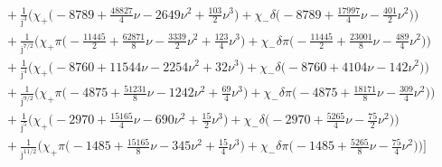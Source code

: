\documentclass[prd,superscriptaddress,preprintnumbers,tightenlines,nofootinbib, eqsecnum]{revtex4-2}
\newcommand{\nn}{\nonumber}
\begin{document}
\begin{align}
&\qquad\quad + \frac{1}{\bar{\jmath}^{3}}\Bigg(\chi_{+}\bigg(-8789 + \frac{48827}{4}\nu - 2649 \nu^{2} + \frac{103}{2}\nu^{3}\bigg) + \chi_{-}\delta\bigg(-8789 + \frac{17997}{4}\nu - \frac{401}{2}\nu^{2}\bigg)\Bigg) \nn \\
&\qquad\quad + \frac{1}{\bar{\jmath}^{7/2}}\Bigg(\chi_{+}\pi\bigg(-\frac{11445}{2} + \frac{62871}{8}\nu - \frac{3339}{2}\nu^{2} + \frac{123}{4}\nu^{3}\bigg) + \chi_{-}\delta\pi\bigg(-\frac{11445}{2} + \frac{23001}{8}\nu - \frac{489}{4}\nu^{2}\bigg)\Bigg) \nn \\
&\qquad\quad + \frac{1}{\bar{\jmath}^{4}}\Bigg(\chi_{+}\bigg(-8760 + 11544 \nu - 2254 \nu^{2} + 32 \nu^{3}\bigg) + \chi_{-}\delta\bigg(-8760 + 4104 \nu - 142 \nu^{2}\bigg)\Bigg) \nn \\
&\qquad\quad + \frac{1}{\bar{\jmath}^{9/2}}\Bigg(\chi_{+}\pi\bigg(-4875 + \frac{51231}{8}\nu - 1242 \nu^{2} + \frac{69}{4}\nu^{3}\bigg) + \chi_{-}\delta\pi\bigg(-4875 + \frac{18171}{8}\nu - \frac{309}{4}\nu^{2}\bigg)\Bigg) \nn \\
&\qquad\quad + \frac{1}{\bar{\jmath}^{5}}\Bigg(\chi_{+}\bigg(-2970 + \frac{15165}{4}\nu - 690 \nu^{2} + \frac{15}{2}\nu^{3}\bigg) + \chi_{-}\delta\bigg(-2970 + \frac{5265}{4}\nu - \frac{75}{2}\nu^{2}\bigg)\Bigg) \nn \\
&\qquad\quad + \frac{1}{\bar{\jmath}^{11/2}}\Bigg(\chi_{+}\pi\bigg(-1485 + \frac{15165}{8}\nu - 345 \nu^{2} + \frac{15}{4}\nu^{3}\bigg) + \chi_{-}\delta\pi\bigg(-1485 + \frac{5265}{8}\nu - \frac{75}{4}\nu^{2}\bigg)\Bigg)\Bigg]
\end{align}
\end{document}
